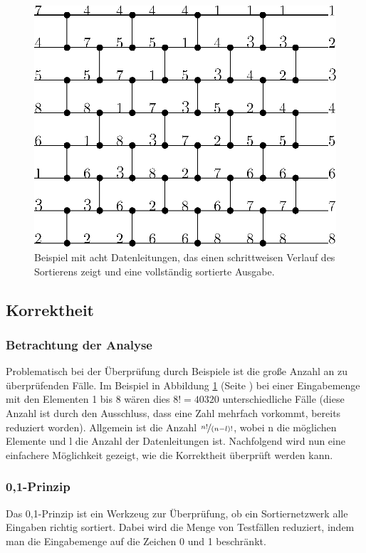 \documentclass[11pt,ngerman]{article}
\begin{document}
\begin{figure}
\begin{center}
\includegraphics[scale=1]{bild2beispiel.eps}
\caption{Beispiel mit acht Datenleitungen, das einen schrittweisen Verlauf des Sortierens zeigt und eine vollständig sortierte Ausgabe.}
\label{fig:kompnetnumbex}
\end{center}
\end{figure}
\subsection{Korrektheit}
\subsubsection{Betrachtung der Analyse}
Problematisch bei der Überprüfung durch Beispiele ist die große Anzahl an zu überprüfenden Fälle. Im Beispiel in Abbildung \ref{fig:kompnetnumbex} (Seite \pageref{fig:kompnetnumbex}) bei einer Eingabemenge mit den Elementen 1 bis 8 wären dies $8! = 40320$ unterschiedliche Fälle (diese Anzahl ist durch den Ausschluss, dass eine Zahl mehrfach vorkommt, bereits reduziert worden). Allgemein ist die Anzahl $\nicefrac{n!}{(n-l)!}$, wobei n die möglichen Elemente und l die Anzahl der Datenleitungen ist. Nachfolgend wird nun eine einfachere Möglichkeit gezeigt, wie die Korrektheit überprüft werden kann.
\subsubsection{0,1-Prinzip}
Das 0,1-Prinzip ist ein Werkzeug zur Überprüfung, ob ein Sortiernetzwerk alle Eingaben richtig sortiert. Dabei wird die Menge von Testfällen reduziert, indem man die Eingabemenge auf die Zeichen 0 und 1 beschränkt.
\end{document}
